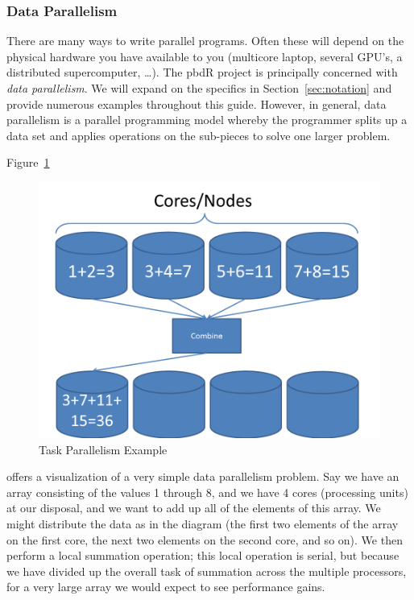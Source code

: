 \subsubsection{Data Parallelism}

There are many ways to write parallel programs.  Often these will depend on the physical hardware you have available to you (multicore laptop, several GPU's, a distributed supercomputer, \dots).  The pbdR project is principally concerned with \emph{data parallelism}.  We will expand on the specifics in Section~\ref{sec:notation} and provide numerous examples throughout this guide.  However, in general, data parallelism is a parallel programming model whereby the programmer splits up a data set and applies operations on the sub-pieces to solve one larger problem.

Figure~\ref{fig:dataparallel} 
\begin{figure}[h]
 \centering
 \includegraphics[scale=.45]{pbdDEMO-include/pics/parallelism_data}
 \caption{Task Parallelism Example}
 \label{fig:dataparallel}
\end{figure}
offers a visualization of a very simple data parallelism problem.  Say we have an array consisting of the values 1 through 8, and we have 4 cores (processing units) at our disposal, and we want to add up all of the elements of this array.  We might distribute the data as in the diagram (the first two elements of the array on the first core, the next two elements on the second core, and so on).  We then perform a local summation operation; this local operation is serial, but because we have divided up the overall task of summation across the multiple processors, for a very large array we would expect to see performance gains.

